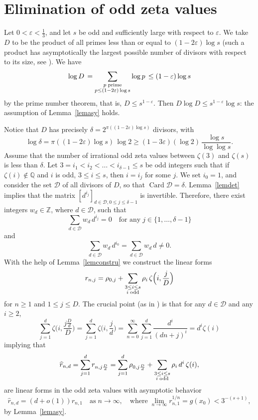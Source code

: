 \documentclass{article}
\numberwithin{equation}{section}
\theoremstyle{remark}
\newcommand{\eps}{\varepsilon}
\newcommand{\Z}{\mathbb{Z}}
\newcommand{\Q}{\mathbb{Q}}
\newcommand{\calD}{{\mathcal D}}
\newcommand{\Card}{\operatorname{Card}}
\begin{document}
\section{Elimination of odd zeta values}\label{sec6}

Let $0 < \eps < \frac13$, and let $s$ be odd and sufficiently large with respect to $\eps$. We take $D$ to be the product of all primes less than or equal to $(1-2\eps) \log s$ (such a product has asymptotically the largest possible number of divisors with respect to its size, see \cite[Chapter XVIII, \S 1]{HW}). We have
$$\log D \, = \sum_{\substack{p \; \mbox{\scriptsize prime}\\ p\leq (1-2\eps) \log s}} \log p \, \leq ( 1-\eps) \log s$$
by the prime number theorem, that is, $D\leq s^{1-\eps}$. Then $D \log D \leq  s^{1-\eps}\log s $: the assumption of Lemma~\ref{lemasy} holds. 

\bigskip

Notice that $D$ has precisely $\delta = 2^{\pi( (1-2\eps) \log s)}$ divisors, with 
$$\log \delta = \pi( (1-2\eps) \log s)\, \log 2 \geq (1-3\eps) (\log 2) \,\frac{\log s}{\log \log s}.$$
Assume that the number of irrational odd zeta values between $\zeta(3)$ and $\zeta(s)$ is less than $\delta$. Let $3 = i_1 < i_2 < \ldots < i_{\delta-1}\leq s$ be odd integers such that if $\zeta(i)\not\in\Q$ and $i$ is odd, $3\leq i \leq s$, then $i=i_j$ for some $j$. We set $i_0=1$, and consider the set $\calD$ of all divisors of $D$, so that $\Card \calD = \delta$. Lemma~\ref{lemdet} implies that the matrix $[d^{i_j}]_{d\in\calD, 0\leq j \leq \delta-1}$ is invertible. Therefore, there exist integers $w_d \in \Z$, where $d\in\calD$, such that 
\begin{equation} \label{eqwun}
\sum_{d\in\calD}w_d \, d^{i_j} = 0 \quad\mbox{for any}\; j\in\{1,\ldots,\delta-1\}
\end{equation}
and
\begin{equation} \label{eqwde}
\sum_{d\in\calD}w_d \, d^{i_0} = \sum_{d\in\calD}w_d \, d \neq 0.
\end{equation}
With the help of Lemma~\ref{lemconstru} we construct the linear forms 
$$r_{n,j} = \rho_{0,j}+\sum_{\substack{3\leq i \leq s\\i \;\mbox{\scriptsize odd}}} \rho_i \, \zeta\Big(i, \frac{j}{D}\Big)$$
for $n \geq 1$ and $1\leq j \leq D$. The crucial point (as in \cite[\S 3]{Sprang}) is that for any $d\in\calD$ and any $i\geq 2$,
$$\sum_{j=1}^d \zeta\bigg(i, \frac{j \frac{D}{d}}{D}\bigg) = \sum_{j=1}^d \zeta\Big(i, \frac{j}{d}\Big) = \sum_{n=0}^\infty \sum_{j=1}^d \frac{d^i}{(dn+j)^i} = d^i \zeta(i)$$
implying that
$$\widehat r_{n,d} = \sum_{j=1}^d r_{n, j\frac{D}{d}}
= \sum_{j=1}^d \rho_{0,j\frac{D}{d}} +\sum_{\substack{3\leq i \leq s\\i \;\mbox{\scriptsize odd}}} \rho_i \, d^i \, \zeta(i),$$
are linear forms in the odd zeta values with asymptotic behavior
$$\widehat r_{n,d} = (d+o(1))r_{n,1} \quad\text{as}\; n\to\infty, \quad\mbox{where}\; \lim_{n\to\infty} r_{n,1}^{1/n} = g(x_0) <3^{-(s+1)},$$
by Lemma~\ref{lemasy}.
\end{document}
